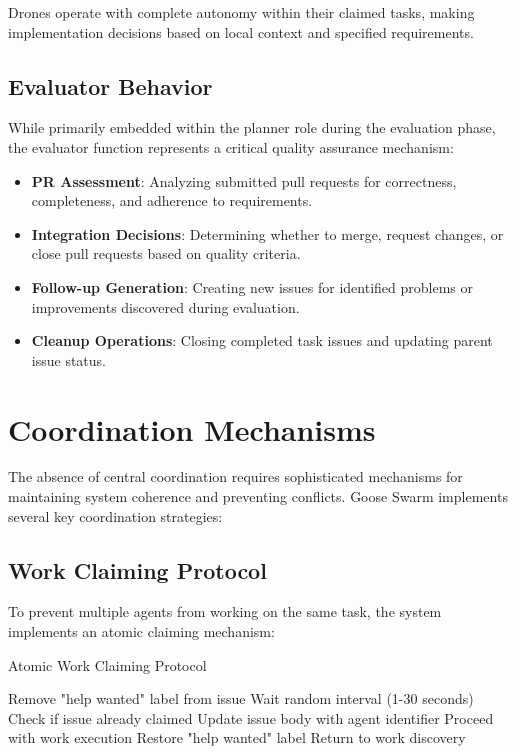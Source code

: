 \documentclass[11pt,a4paper]{article}
\begin{document}
Drones operate with complete autonomy within their claimed tasks, making implementation decisions based on local context and specified requirements.

\subsection{Evaluator Behavior}

While primarily embedded within the planner role during the evaluation phase, the evaluator function represents a critical quality assurance mechanism:

\begin{itemize}
    \item \textbf{PR Assessment}: Analyzing submitted pull requests for correctness, completeness, and adherence to requirements.
    
    \item \textbf{Integration Decisions}: Determining whether to merge, request changes, or close pull requests based on quality criteria.
    
    \item \textbf{Follow-up Generation}: Creating new issues for identified problems or improvements discovered during evaluation.
    
    \item \textbf{Cleanup Operations}: Closing completed task issues and updating parent issue status.
\end{itemize}

\section{Coordination Mechanisms}

The absence of central coordination requires sophisticated mechanisms for maintaining system coherence and preventing conflicts. Goose Swarm implements several key coordination strategies:

\subsection{Work Claiming Protocol}

To prevent multiple agents from working on the same task, the system implements an atomic claiming mechanism:

\begin{algorithm}
\caption{Atomic Work Claiming Protocol}
\begin{algorithmic}[1]
\STATE Remove "help wanted" label from issue
\STATE Wait random interval (1-30 seconds)
\STATE Check if issue already claimed
    \STATE Update issue body with agent identifier
    \STATE Proceed with work execution
\ELSE
    \STATE Restore "help wanted" label
    \STATE Return to work discovery
\ENDIF
\end{algorithmic}
\end{algorithm}
\end{document}
